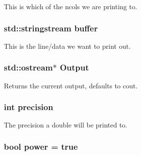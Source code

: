 This is which of the ncols we are printing to. \hypertarget{classJKBuilder_1_1IOManager_adbf6a7492c6521b38c1510aebe307770}{
\subsubsection[{buffer}]{\setlength{\rightskip}{0pt plus 5cm}std::stringstream {\bf buffer}}}
\label{classJKBuilder_1_1IOManager_adbf6a7492c6521b38c1510aebe307770}


This is the line/data we want to print out. \hypertarget{classJKBuilder_1_1IOManager_aafe3b1218427d92a689d147f74e74f4b}{
\subsubsection[{Output}]{\setlength{\rightskip}{0pt plus 5cm}std::ostream$\ast$ {\bf Output}}}
\label{classJKBuilder_1_1IOManager_aafe3b1218427d92a689d147f74e74f4b}


Returns the current output, defaults to cout. \hypertarget{classJKBuilder_1_1IOManager_aa95455ed52a8459fad69509a4a0411b5}{
\subsubsection[{precision}]{\setlength{\rightskip}{0pt plus 5cm}int {\bf precision}}}
\label{classJKBuilder_1_1IOManager_aa95455ed52a8459fad69509a4a0411b5}


The precision a double will be printed to. \hypertarget{classJKBuilder_1_1IOManager_aababa9aef0d20ddcfce2d78f41ae1dd8}{
\subsubsection[{power}]{\setlength{\rightskip}{0pt plus 5cm}bool {\bf power} = true}}
\label{classJKBuilder_1_1IOManager_aababa9aef0d20ddcfce2d78f41ae1dd8}


